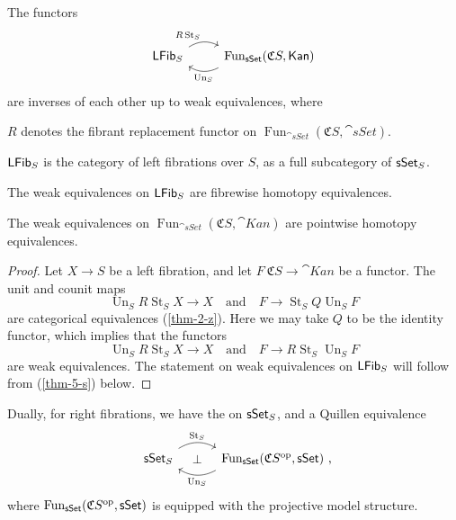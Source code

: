 \begin{corollary}
    The functors 
    \[\begin{tikzcd}
        \smash{\cat{LFib}_{\/S}}\vphantom{1_1}\ar[r,bend left,start anchor=north east,end anchor=north west,"R\operatorname{St}_S"] &
        \operatorname{Fun}_{\cat{sSet}}(\mathfrak CS,\cat{Kan})\ar[l,bend left,start anchor=south west,end anchor=south east,"\operatorname{Un}_S"]
    \end{tikzcd}\]
    are inverses of each other up to weak equivalences, where 
    \begin{itms}
        \item $R$ denotes the fibrant replacement functor on
        $\operatorname{Fun}_{\cat{sSet}}(\mathfrak CS,\cat{sSet})$.
        \item $\mathsf{LFib}_{\/S}$ is the category of left fibrations over $S$,
        as a full subcategory of $\mathsf{sSet}_{\/S}$.
        \item The weak equivalences on $\mathsf{LFib}_{\/S}$
        are fibrewise homotopy equivalences.
        \item The weak equivalences on 
        $\operatorname{Fun}_{\cat{sSet}}(\mathfrak CS,\cat{Kan})$
        are pointwise homotopy equivalences.
    \end{itms}
\end{corollary}

\begin{proof}
    Let $X\to S$ be a left fibration, and let $F\:\mathfrak CS\to\cat{Kan}$ be a functor.
    The unit and counit maps
    \[ \operatorname{Un}_SR\operatorname{St}_SX\to X\quad\text{and}\quad F\to\operatorname{St}_SQ\operatorname{Un}_SF \]
    are categorical equivalences (\ref{thm-2-z}).
    Here we may take $Q$ to be the identity functor, 
    which implies that the functors
    \[ \operatorname{Un}_SR\operatorname{St}_SX\to X\quad\text{and}\quad F\to R\operatorname{St}_S\operatorname{Un}_SF \]
    are weak equivalences.
    The statement on weak equivalences on $\mathsf{LFib}_{\/S}$
    will follow from (\ref{thm-5-s}) below.
\end{proof}

\begin{remark}
    Dually, for right fibrations, we have the 
    on $\mathsf{sSet}_{\/S}$, and a Quillen equivalence
    \[\begin{tikzcd}[column sep=3em]
        \cat{sSet}_{\/S}\ar[r,bend left,start anchor=north east,end anchor=north west,"\operatorname{St}_S"]
        \ar[r,phantom,"\bot"] &
        \operatorname{Fun}_{\cat{sSet}}(\mathfrak CS\op,\cat{sSet})\rlap{\ ,}
        \ar[l,bend left,start anchor=south west,end anchor=south east,"\operatorname{Un}_S"]
    \end{tikzcd}\]
    where $\operatorname{Fun}_{\mathsf{sSet}}(\mathfrak CS^{\mathrm{op}},\mathsf{sSet})$
    is equipped with the projective model structure. \varqed
\end{remark}

